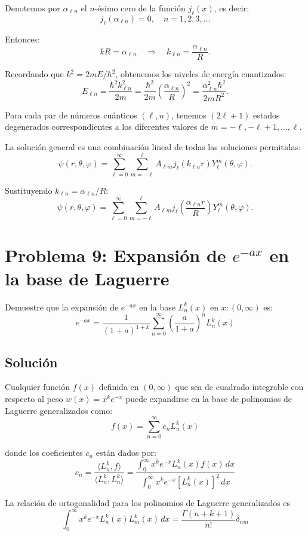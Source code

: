 \documentclass[a4paper]{article}
\begin{document}
Denotemos por $\alpha_{\ell n}$ el $n$-ésimo cero de la función $j_\ell(x)$, es decir:
$$j_\ell(\alpha_{\ell n}) = 0, \quad n = 1, 2, 3, \ldots$$

Entonces:
$$kR = \alpha_{\ell n} \quad \Rightarrow \quad k_{\ell n} = \frac{\alpha_{\ell n}}{R}.$$

Recordando que $k^2 = 2mE/\hbar^2$, obtenemos los niveles de energía cuantizados:
$$E_{\ell n} = \frac{\hbar^2 k_{\ell n}^2}{2m} = \frac{\hbar^2}{2m}\left(\frac{\alpha_{\ell n}}{R}\right)^2 = \frac{\alpha_{\ell n}^2\hbar^2}{2mR^2}.$$

Para cada par de números cuánticos $(\ell, n)$, tenemos $(2\ell+1)$ estados degenerados correspondientes a los diferentes valores de $m = -\ell, -\ell+1, \ldots, \ell$.

La solución general es una combinación lineal de todas las soluciones permitidas:
$$\psi(r,\theta,\varphi) = \sum_{\ell=0}^{\infty}\sum_{m=-\ell}^{\ell} A_{\ell m} j_\ell(k_{\ell n}r) Y_{\ell}^m(\theta,\varphi).$$

Sustituyendo $k_{\ell n} = \alpha_{\ell n}/R$:
$$\psi(r,\theta,\varphi) = \sum_{\ell=0}^{\infty}\sum_{m=-\ell}^{\ell} A_{\ell m} j_\ell\left(\frac{\alpha_{\ell n}r}{R}\right) Y_{\ell}^m(\theta,\varphi).$$

\section{Problema 9: Expansión de $e^{-ax}$ en la base de Laguerre}

Demuestre que la expansión de $e^{-ax}$ en la base $L_n^k(x)$ en $x: (0, \infty)$ es:
$$e^{-ax} = \frac{1}{(1+a)^{1+k}} \sum_{n=0}^{\infty} \left(\frac{a}{1+a}\right)^n L_n^k(x)$$

\subsection{Solución}


Cualquier función $f(x)$ definida en $(0, \infty)$ que sea de cuadrado integrable con respecto al peso $w(x) = x^k e^{-x}$ puede expandirse en la base de polinomios de Laguerre generalizados como:
$$f(x) = \sum_{n=0}^{\infty} c_n L_n^k(x)$$

donde los coeficientes $c_n$ están dados por:
$$c_n = \frac{\langle L_n^k, f \rangle}{\langle L_n^k, L_n^k \rangle} = \frac{\int_0^{\infty} x^k e^{-x} L_n^k(x) f(x) \, dx}{\int_0^{\infty} x^k e^{-x} [L_n^k(x)]^2 \, dx}$$


La relación de ortogonalidad para los polinomios de Laguerre generalizados es 
$$\int_0^{\infty} x^k e^{-x} L_n^k(x) L_m^k(x) \, dx = \frac{\Gamma(n+k+1)}{n!} \delta_{nm}$$
\end{document}
